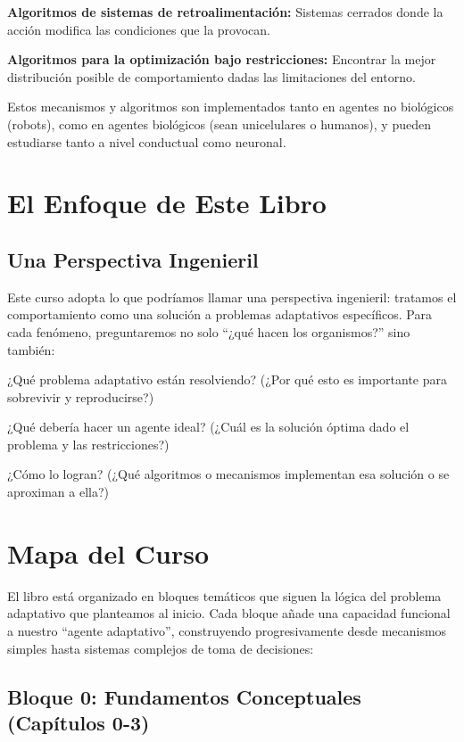 \documentclass[
  letterpaper,
  DIV=11,
  numbers=noendperiod]{scrreprt}
\begin{document}
\textbf{Algoritmos de sistemas de retroalimentación:} Sistemas cerrados
donde la acción modifica las condiciones que la provocan.

\textbf{Algoritmos para la optimización bajo restricciones:} Encontrar
la mejor distribución posible de comportamiento dadas las limitaciones
del entorno.

Estos mecanismos y algoritmos son implementados tanto en agentes no
biológicos (robots), como en agentes biológicos (sean unicelulares o
humanos), y pueden estudiarse tanto a nivel conductual como neuronal.

\section{El Enfoque de Este Libro}\label{el-enfoque-de-este-libro}

\subsection{Una Perspectiva
Ingenieril}\label{una-perspectiva-ingenieril}

Este curso adopta lo que podríamos llamar una perspectiva ingenieril:
tratamos el comportamiento como una solución a problemas adaptativos
específicos. Para cada fenómeno, preguntaremos no solo ``¿qué hacen los
organismos?'' sino también:

¿Qué problema adaptativo están resolviendo? (¿Por qué esto es importante
para sobrevivir y reproducirse?)

¿Qué debería hacer un agente ideal? (¿Cuál es la solución óptima dado el
problema y las restricciones?)

¿Cómo lo logran? (¿Qué algoritmos o mecanismos implementan esa solución
o se aproximan a ella?)

\section{Mapa del Curso}\label{mapa-del-curso}

El libro está organizado en bloques temáticos que siguen la lógica del
problema adaptativo que planteamos al inicio. Cada bloque añade una
capacidad funcional a nuestro ``agente adaptativo'', construyendo
progresivamente desde mecanismos simples hasta sistemas complejos de
toma de decisiones:

\subsection{Bloque 0: Fundamentos Conceptuales (Capítulos
0-3)}\label{bloque-0-fundamentos-conceptuales-capuxedtulos-0-3}
\end{document}
